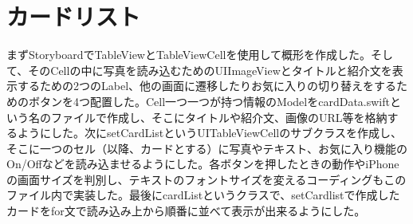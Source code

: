 \section{カードリスト}
まずStoryboardでTableViewとTableViewCellを使用して概形を作成した。そして、そのCellの中に写真を読み込むためのUIImageViewとタイトルと紹介文を表示するための2つのLabel、他の画面に遷移したりお気に入りの切り替えをするためのボタンを4つ配置した。Cell一つ一つが持つ情報のModelをcardData.swiftという名のファイルで作成し、そこにタイトルや紹介文、画像のURL等を格納するようにした。次にsetCardListというUITableViewCellのサブクラスを作成し、そこに一つのセル（以降、カードとする）に写真やテキスト、お気に入り機能のOn/Offなどを読み込ませるようにした。各ボタンを押したときの動作やiPhoneの画面サイズを判別し、テキストのフォントサイズを変えるコーディングもこのファイル内で実装した。最後にcardListというクラスで、setCardlistで作成したカードをfor文で読み込み上から順番に並べて表示が出来るようにした。
